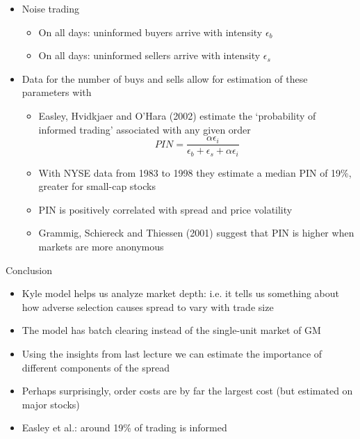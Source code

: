 \documentclass[english,10pt]{beamer}
\begin{document}
\begin{frame}{}
	\begin{itemize}
		\item Noise trading
		\begin{itemize}
			\item On all days: uninformed buyers arrive with intensity $\epsilon_b$
			\item On all days: uninformed sellers arrive with intensity $\epsilon_s$
		\end{itemize}
		\item Data for the number of buys and sells allow for estimation of these parameters with 
		\begin{itemize}
			\item Easley, Hvidkjaer and O'Hara (2002) estimate the `probability of informed trading' associated with any given order
			\begin{equation} \tag{5.27}
			PIN = \frac{\alpha \epsilon_i}{\epsilon_b + \epsilon_s + \alpha \epsilon_i}
			\end{equation}
			\item With NYSE data from 1983 to 1998 they estimate a median PIN of 19\%, greater for small-cap stocks
			\item PIN is positively correlated with  spread and price volatility
			\item Grammig, Schiereck and Thiessen (2001) suggest that PIN is higher when markets are more anonymous
		\end{itemize}
	\end{itemize}
\end{frame}


\begin{frame}{Conclusion}
	\begin{itemize}
		\item Kyle model helps us analyze market depth: i.e. it tells us something about how adverse selection causes spread to vary with trade size
		\item The model has batch clearing instead of the single-unit market of GM
		\item Using the insights from last lecture we can estimate the importance of different components of the spread
		\item Perhaps surprisingly, order costs are by far the largest cost (but estimated on major stocks)
		\item Easley et al.: around 19\% of trading is informed
	\end{itemize}
\end{frame}
\end{document}
